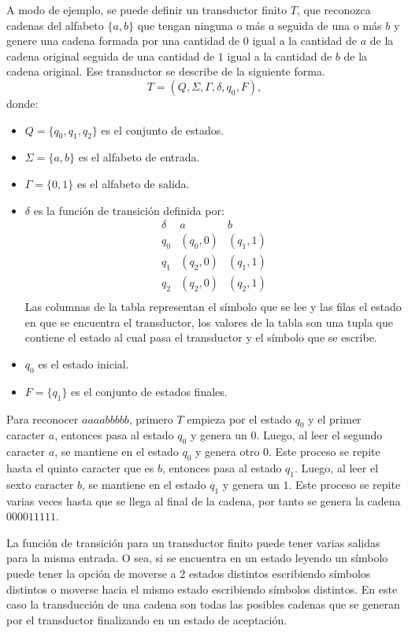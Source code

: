 A modo de ejemplo, se puede definir un transductor finito $T$, que reconozca cadenas del alfabeto $\{a,b\}$ que tengan ninguna o más $a$ seguida de una o más $b$ y genere una cadena formada por una cantidad de $0$ igual a la cantidad de $a$ de la cadena original seguida de una cantidad de $1$ igual a la cantidad de $b$ de la cadena original. Ese transductor se describe de la siguiente forma.
\[
  T = (Q, \Sigma, \Gamma, \delta, q_0, F),
\]
donde:
\begin{itemize}
  \item \(Q = \{q_0, q_1, q_2\}\) es el conjunto de estados.
  \item \(\Sigma = \{a, b\}\) es el alfabeto de entrada.
  \item \(\Gamma = \{0, 1\}\) es el alfabeto de salida.
  \item \(\delta\) es la función de transición definida por:
        \[
          \begin{array}{c|c|c}
            \delta & a        & b        \\
            \hline
            q_0    & (q_0, 0) & (q_1, 1) \\
            q_1    & (q_2, 0) & (q_1, 1) \\
            q_2    & (q_2, 0) & (q_2, 1) \\
          \end{array}
        \]
        Las columnas de la tabla representan el símbolo que se lee y las filas el estado en que se encuentra el transductor, 
        los valores de la tabla son una tupla que contiene el estado al cual pasa el transductor y el símbolo que se escribe.
  \item \(q_0\) es el estado inicial.
  \item \(F = \{q_1\}\) es el conjunto de estados finales.
\end{itemize}

Para reconocer $aaaabbbbb$, primero $T$ empieza por el estado $q_0$ y el primer caracter $a$, entonces pasa al estado $q_0$ y genera un $0$.
Luego, al leer el segundo caracter $a$, se mantiene en el estado $q_0$ y genera otro $0$. Este proceso se repite hasta el quinto caracter
que es $b$, entonces pasa al estado $q_1$. Luego, al leer el sexto caracter $b$, se mantiene en el estado $q_1$ y genera un $1$. Este proceso
se repite varias veces hasta que se llega al final de la cadena, por tanto se genera la cadena $000011111$.

La función de transición para un transductor finito puede tener varias salidas para la misma entrada. O sea, si se encuentra en un estado leyendo un símbolo
puede tener la opción de moverse a 2 estados distintos escribiendo símbolos distintos o moverse hacia el mismo estado 
escribiendo símbolos distintos. En este caso la transducción de una cadena son todas las posibles cadenas que se generan
por el transductor finalizando en un estado de aceptación.


